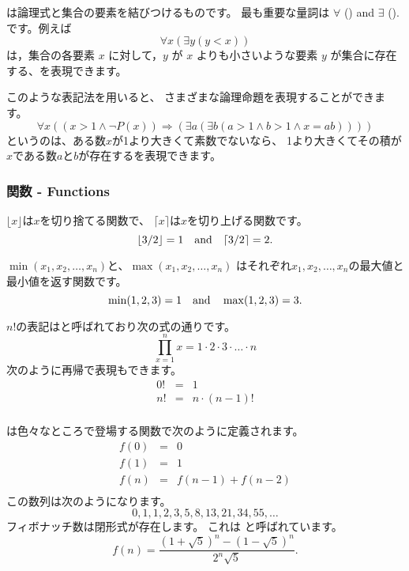 
は論理式と集合の要素を結びつけるものです。
最も重要な量詞は
$\forall$ () and $\exists$ ().
です。例えば
\[\forall x (\exists y (y < x))\]
は，集合の各要素 $x$ に対して，$y$ が $x$ よりも小さいような要素 $y$ が集合に存在する、を表現できます。

このような表記法を用いると、
さまざまな論理命題を表現することができます。
\[\forall x ((x>1 \land \lnot P(x)) \Rightarrow (\exists a (\exists b (a > 1 \land b > 1 \land x = ab))))\]
というのは、ある数$x$が1より大きくて素数でないなら、
1より大きくてその積が$x$である数$a$と$b$が存在するを表現できます。

\subsubsection{関数 - Functions}

$\lfloor x \rfloor$は$x$を切り捨てる関数で、
$\lceil x \rceil$は$x$を切り上げる関数です。
\[ \lfloor 3/2 \rfloor = 1 \hspace{10px} \textrm{and} \hspace{10px} \lceil 3/2 \rceil = 2.\]

$\min(x_1,x_2,\ldots,x_n)$と、$\max(x_1,x_2,\ldots,x_n)$
はそれぞれ$x_1,x_2,\ldots,x_n$の最大値と最小値を返す関数です。
\[ \min(1,2,3)=1 \hspace{10px} \textrm{and} \hspace{10px} \max(1,2,3)=3.\]


$n!$の表記はと呼ばれており次の式の通りです。
\[\prod_{x=1}^n x = 1 \cdot 2 \cdot 3 \cdot \ldots \cdot n\]
次のように再帰で表現もできます。
\[
\begin{array}{lcl}
0! & = & 1 \\
n! & = & n \cdot (n-1)! \\
\end{array}
\]


は色々なところで登場する関数で次のように定義されます。
\[
\begin{array}{lcl}
f(0) & = & 0 \\
f(1) & = & 1 \\
f(n) & = & f(n-1)+f(n-2) \\
\end{array}
\]
この数列は次のようになります。
\[0, 1, 1, 2, 3, 5, 8, 13, 21, 34, 55, \ldots\]
フィボナッチ数は閉形式が存在します。
これは 
と呼ばれています。
\[f(n)=\frac{(1 + \sqrt{5})^n - (1-\sqrt{5})^n}{2^n \sqrt{5}}.\]

